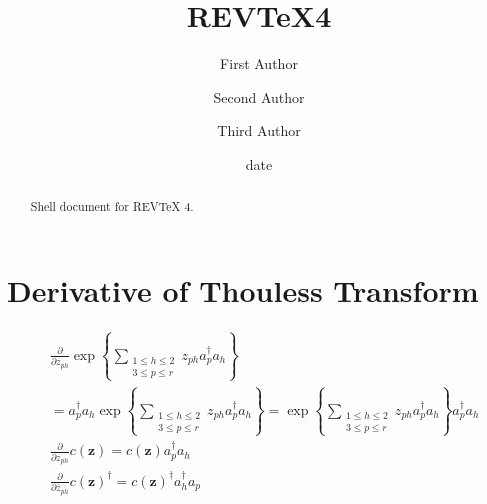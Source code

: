 \documentclass[aps,preprint]{revtex4}%
\begin{document}
\title[Short title for running header]{REV\TeX4}
\author{First Author}
\author{Second Author}
\author{Third Author}

\begin{abstract}
Shell document for REV\TeX{} 4.

\end{abstract}
\date[Date text]{date}




\maketitle
\tableofcontents


\section{Derivative of Thouless Transform}%

\begin{align}
&  \frac{\partial}{\partial z_{ph}}\exp\left\{  \sum\limits_{\substack{1\leq
h\leq2\\3\leq p\leq r}}z_{ph}a_{p}^{\dagger}a_{h}\right\} \nonumber\\
&  =a_{p}^{\dagger}a_{h}\exp\left\{  \sum\limits_{\substack{1\leq
h\leq2\\3\leq p\leq r}}z_{ph}a_{p}^{\dagger}a_{h}\right\}  =\exp\left\{
\sum\limits_{\substack{1\leq h\leq2\\3\leq p\leq r}}z_{ph}a_{p}^{\dagger}%
a_{h}\right\}  a_{p}^{\dagger}a_{h}\nonumber\\
&  \frac{\partial}{\partial z_{ph}}c\left(  \mathbf{z}\right)  =c\left(
\mathbf{z}\right)  a_{p}^{\dagger}a_{h}\nonumber\\
&  \frac{\partial}{\partial\bar{z}_{ph}}c\left(  \mathbf{z}\right)  ^{\dagger
}=c\left(  \mathbf{z}\right)  ^{\dagger}a_{h}^{\dagger}a_{p}%
\end{align}
\end{document}
